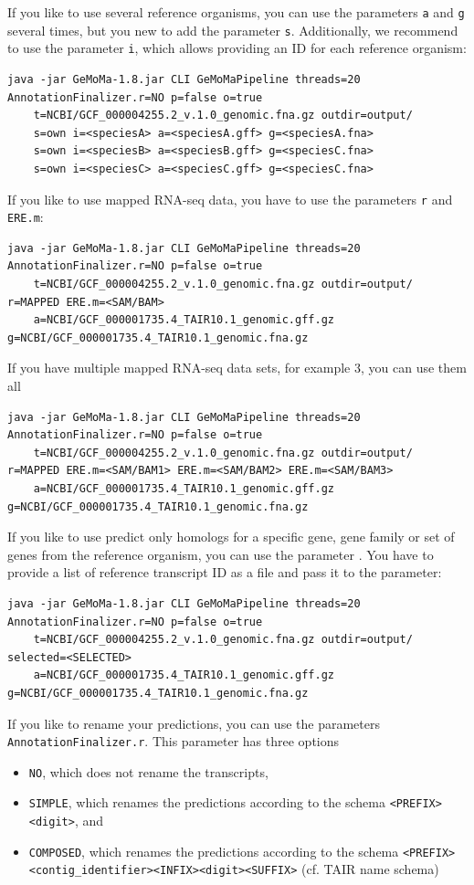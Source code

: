 \documentclass{article}
\begin{document}
If you like to use several reference organisms, you can use the parameters \verb+a+ and \verb+g+ several times, but you new to add the parameter \verb+s+. Additionally, we recommend to use the parameter \verb+i+, which allows providing an ID for each reference organism:
\begin{Verbatim}
java -jar GeMoMa-1.8.jar CLI GeMoMaPipeline threads=20 AnnotationFinalizer.r=NO p=false o=true 
	t=NCBI/GCF_000004255.2_v.1.0_genomic.fna.gz outdir=output/
	s=own i=<speciesA> a=<speciesA.gff> g=<speciesA.fna>
	s=own i=<speciesB> a=<speciesB.gff> g=<speciesC.fna>
	s=own i=<speciesC> a=<speciesC.gff> g=<speciesC.fna>
\end{Verbatim}
If you like to use mapped RNA-seq data, you have to use the parameters \verb+r+ and \verb+ERE.m+:
\begin{Verbatim}
java -jar GeMoMa-1.8.jar CLI GeMoMaPipeline threads=20 AnnotationFinalizer.r=NO p=false o=true
	t=NCBI/GCF_000004255.2_v.1.0_genomic.fna.gz outdir=output/ r=MAPPED ERE.m=<SAM/BAM>
	a=NCBI/GCF_000001735.4_TAIR10.1_genomic.gff.gz g=NCBI/GCF_000001735.4_TAIR10.1_genomic.fna.gz 
\end{Verbatim}
If you have multiple mapped RNA-seq data sets, for example 3, you can use them all
\begin{Verbatim}
java -jar GeMoMa-1.8.jar CLI GeMoMaPipeline threads=20 AnnotationFinalizer.r=NO p=false o=true 
	t=NCBI/GCF_000004255.2_v.1.0_genomic.fna.gz outdir=output/ r=MAPPED ERE.m=<SAM/BAM1> ERE.m=<SAM/BAM2> ERE.m=<SAM/BAM3>
	a=NCBI/GCF_000001735.4_TAIR10.1_genomic.gff.gz g=NCBI/GCF_000001735.4_TAIR10.1_genomic.fna.gz 
\end{Verbatim}
If you like to use predict only homologs for a specific gene, gene family or set of genes from the reference organism, you can use the parameter \verb++. You have to provide a list of reference transcript ID as a file and pass it to the parameter:
\begin{Verbatim}
java -jar GeMoMa-1.8.jar CLI GeMoMaPipeline threads=20 AnnotationFinalizer.r=NO p=false o=true 
	t=NCBI/GCF_000004255.2_v.1.0_genomic.fna.gz outdir=output/ selected=<SELECTED>
	a=NCBI/GCF_000001735.4_TAIR10.1_genomic.gff.gz g=NCBI/GCF_000001735.4_TAIR10.1_genomic.fna.gz 
\end{Verbatim}
If you like to rename your predictions, you can use the parameters \verb+AnnotationFinalizer.r+. This parameter has three options
\begin{itemize}
\item \verb+NO+, which does not rename the transcripts,
\item \verb+SIMPLE+, which renames the predictions according to the schema \verb+<PREFIX><digit>+, and
\item \verb+COMPOSED+, which renames the predictions according to the schema \verb+<PREFIX><contig_identifier><INFIX><digit><SUFFIX>+ (cf. TAIR name schema)
\end{itemize}
\end{document}

